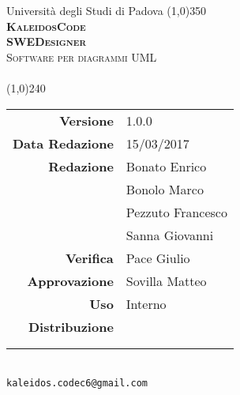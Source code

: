 \documentclass[a4paper,12pt]{article}
\author{KaleidosCode}
\date{15/03/2017}	%
\begin{document}
	\begin{titlepage}
		\centering Università degli Studi di Padova
		\line(1,0){350}\\
		\vspace{0.4cm}
		{\bfseries\scshape\LARGE KaleidosCode\\}
		\vspace{0.4cm}
		{\bfseries\scshape\LARGE SWEDesigner\\}
		{\scshape\Large Software per diagrammi UML\\}
		\vspace{1cm}
		{\scshape\Large \analisideirequisitii\ \\}		%
		\vspace{1.4cm}
		\logo
		\vspace{1.2cm}
		\line(1,0){240}\\
		\begin{tabular}{r|l}
			{\hfill \textbf{Versione}} 			& 1.0.0\\
			{\hfill \textbf{Data Redazione}} 	& 15/03/2017\\	%
			{\hfill \textbf{Redazione}} 		& Bonato Enrico\\ & Bonolo Marco\\ & Pezzuto Francesco\\  & Sanna Giovanni\\
			{\hfill \textbf{Verifica}} 			& Pace Giulio\\
			{\hfill \textbf{Approvazione}} 		& Sovilla Matteo\\
			{\hfill \textbf{Uso}} 				& Interno\\
			{\hfill \textbf{Distribuzione}} 	& \vardanega \\ & \cardin \\ & \proponente\\
		\end{tabular}\\
		\vspace{2cm}
		\texttt{kaleidos.codec6@gmail.com}
	\end{titlepage}

	\pagestyle{myfront}
	\newpage
		
	\newpage
		\tableofcontents
	\pagestyle{mymain}
	\newpage
		
%		
%		
%		
%		
	\label{LastPage}
\end{document}
